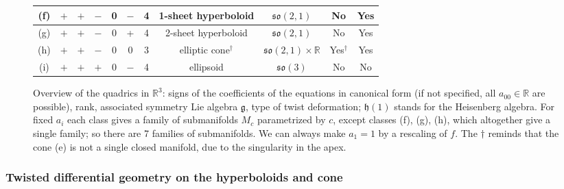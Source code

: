 \documentclass[a4paper,11pt]{article}
\begin{document}
\begin{figure}[h!]
\begin{center}
\begin{tabular}{|c|c|c|c|c|c|c|c|c|c|c|}
\hline
(f) & $+$ & $+$ & $-$  & 0 & $-$ & 4 &  1-sheet  hyperboloid
& $\mathfrak{so}(2,1)$ & No & Yes \\
\hline
(g) & $+$ & $+$ & $-$  & 0 &+& 4 & 2-sheet hyperboloid
& $\mathfrak{so}(2,1)$ & No & Yes \\
\hline
(h) & $+$ & $+$ & $-$  & 0 & 0 & 3 &  elliptic cone$^\dagger$
& $\mathfrak{so}(2,\!1)\!\times\!\mathbb{R}$ & Yes$^\dagger$ & Yes \\
\hline
(i) & $+$ & $+$ & $+$ & 0 & $-$ & 4 & ellipsoid & $\mathfrak{so}(3)$ & No & No \\
\hline
\end{tabular}
\end{center}
\caption{Overview of the quadrics in $\mathbb{R}^3$: signs of the coefficients of the equations in canonical form
(if not specified, all $a_{00}\in\mathbb{R}$ are possible), 
rank,  associated symmetry Lie algebra $\mathfrak{g}$, type of twist deformation;
$\mathfrak{h}(1)$  stands for the Heisenberg algebra.
For fixed $a_i$ each class gives a family of submanifolds $M_c$ parametrized by $c$,
except classes (f), (g), (h), which altogether give a single family; 
so there are 7 families of submanifolds. We can always make $a_1=1$
by a rescaling of $f$. The $\dagger$ reminds  that the
cone (e) is not a single closed manifold, due to the singularity in the apex.}
\label{QuadricSummary}
\end{figure}

\subsubsection*{Twisted differential geometry on the hyperboloids and cone}
\end{document}
